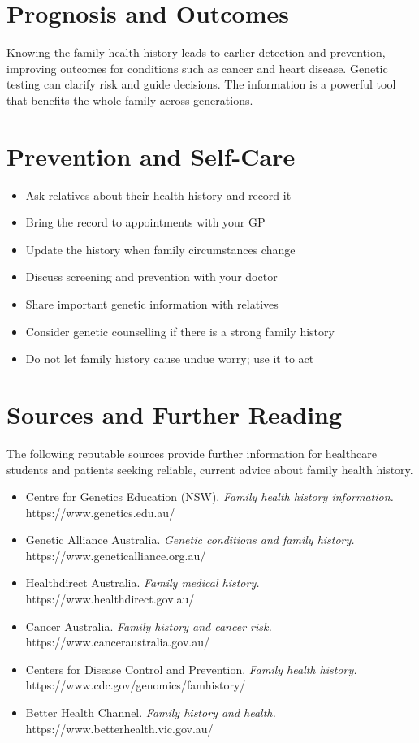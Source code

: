 \section*{Prognosis and Outcomes}
Knowing the family health history leads to earlier detection and prevention, improving outcomes for conditions such as cancer and heart disease. Genetic testing can clarify risk and guide decisions. The information is a powerful tool that benefits the whole family across generations.

\section*{Prevention and Self-Care}
\begin{itemize}
    \item Ask relatives about their health history and record it
    \item Bring the record to appointments with your GP
    \item Update the history when family circumstances change
    \item Discuss screening and prevention with your doctor
    \item Share important genetic information with relatives
    \item Consider genetic counselling if there is a strong family history
    \item Do not let family history cause undue worry; use it to act
\end{itemize}

\section*{Sources and Further Reading}
The following reputable sources provide further information for healthcare students and patients seeking reliable, current advice about family health history.
\begin{itemize}
    \item Centre for Genetics Education (NSW). \textit{Family health history information.} https://www.genetics.edu.au/
    \item Genetic Alliance Australia. \textit{Genetic conditions and family history.} https://www.geneticalliance.org.au/
    \item Healthdirect Australia. \textit{Family medical history.} https://www.healthdirect.gov.au/
    \item Cancer Australia. \textit{Family history and cancer risk.} https://www.canceraustralia.gov.au/
    \item Centers for Disease Control and Prevention. \textit{Family health history.} https://www.cdc.gov/genomics/famhistory/
    \item Better Health Channel. \textit{Family history and health.} https://www.betterhealth.vic.gov.au/
\end{itemize}
